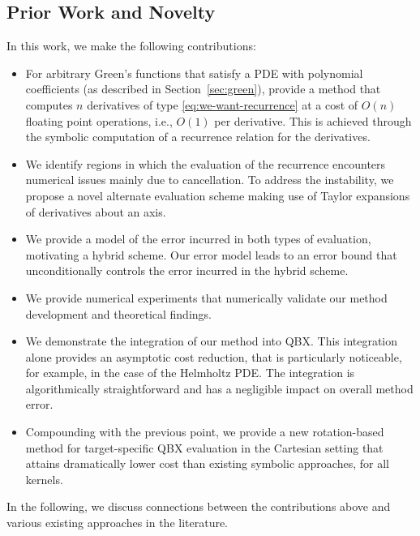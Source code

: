 \documentclass[12pt]{article}
\theoremstyle{definition}
\theoremstyle{plain}
\theoremstyle{definition}
\begin{document}
\subsection{Prior Work and Novelty}
In this work, we make the following contributions:
\begin{itemize}
\item For arbitrary Green's functions that satisfy a PDE with polynomial coefficients (as described in Section~\ref{sec:green}),
provide a method that computes $n$ derivatives of type \eqref{eq:we-want-recurrence} at a cost of $O(n)$ floating point operations, i.e., $O(1)$ per derivative.
This is achieved through the symbolic computation of a recurrence relation for the derivatives.
\item We identify regions in which the evaluation of the recurrence encounters numerical issues mainly due to cancellation. To address the instability, we propose a novel alternate evaluation scheme making use of Taylor expansions of derivatives about an axis.
\item We provide a model of the error incurred in both types of evaluation, motivating a hybrid scheme. Our error model leads to an error bound that unconditionally controls the error incurred in the hybrid scheme.
\item We provide numerical experiments that numerically validate our method development and theoretical findings.
\item We demonstrate the integration of our method into QBX. This integration alone provides an asymptotic cost reduction, that is particularly noticeable, for example, in the case of the Helmholtz PDE. The integration is algorithmically straightforward and has a negligible impact on overall method error.
\item Compounding with the previous point, we provide a new rotation-based method for target-specific QBX evaluation in the Cartesian setting that attains dramatically lower cost than existing symbolic approaches, for all kernels.
\end{itemize}

In the following, we discuss connections between the contributions above and various existing approaches in the literature.
\end{document}
